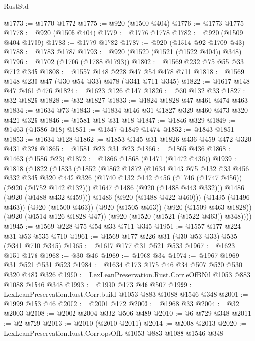\begin{lexlean}{RustStd}
\begin{coremodule}
@1773 := @1770 @1772
@1775 := @920 (@1500 @404)
@1776 := @1773 @1775
@1778 := @920 (@1505 @404)
@1779 := @1776 @1778
@1782 := @920 (@1509 @404 @1709)
@1783 := @1779 @1782
@1787 := @920 (@1514 @92 @1709 @43)
@1788 := @1783 @1787
@1793 := @920 (@1520 (@1521 (@1522 @404)) @348)
@1796 := @1702 (@1706 (@1788 @1793))
@1802 := @1569 @232 @75 @55 @33 @712 @345
@1808 := @1557 @148 @228 @47 @54 @478 @711
@1818 := @1569 @148 @230 @47 (@30 @54 @33) @478 (@341 @711 @345)
@1822 := @1617 @148 @47 @461 @476
@1824 := @1623 @126 @147
@1826 := @30 @132 @33
@1827 := @32 @1826
@1828 := @32 @1827
@1833 := @1824 @1828 @47 @461 @474 @463
@1834 := @1634 @73
@1843 := @1834 @146 @31 @1827 @329 @460 @473 @320 @421 @326
@1846 := @1581 @18 @31 @18
@1847 := @1846 @329
@1849 := @1463 (@1586 @18)
@1851 := @1847 @1849 @1474
@1852 := @1843 @1851
@1853 := @1634 @128
@1862 := @1853 @145 @31 @1826 @436 @459 @472 @320 @431 @326
@1865 := @1581 @23 @31 @23
@1866 := @1865 @436
@1868 := @1463 (@1586 @23)
@1872 := @1866 @1868 (@1471 (@1472 @436))
@1939 := @1818
    (@1822
      (@1833
        (@1852
          (@1862
            @1872
            (@1634
              @143
              @75
              @132
              @33
              @456
              @332
              @345
              @320
              @442
              @326
              (@1740 @132 @142 @456 (@1746 (@1747 @456)) (@920 (@1752 @142 @132)))
              @1647
              @1486
              (@920 (@1488 @443 @332)))
            @1486
            (@920 (@1488 @432 @459)))
          @1486
          (@920 (@1488 @422 @460)))
        (@1495 (@1496 @463))
        (@920 (@1500 @463))
        (@920 (@1505 @463))
        (@920 (@1509 @463 @1828))
        (@920 (@1514 @126 @1828 @47))
        (@920 (@1520 (@1521 (@1522 @463)) @348))))
@1945 := @1569 @228 @75 @54 @33 @711 @345
@1951 := @1557 @177 @224 @31 @53 @535 @710
@1961 := @1569 @177 @226 @31 (@30 @53 @33) @535 (@341 @710 @345)
@1965 := @1617 @177 @31 @521 @533
@1967 := @1623 @151 @176
@1968 := @30 @46
@1969 := @1968 @34
@1974 := @1967 @1969 @31 @521 @531 @523
@1984 := @1634 @173 @175 @46 @34 @507 @520 @530 @320 @483 @326
@1990 := LexLeanPreservation.Rust.Corr.eOfBNil @1053 @883 @1088 @1546 @348
@1993 := @1990 @173 @46 @507
@1999 := LexLeanPreservation.Rust.Corr.build @1053 @883 @1088 @1546 @348
@2001 := @1999 @153 @46
@2002 := @2001 @172
@2003 := @1968 @33
@2004 := @32 @2003
@2008 := @2002 @2004 @332 @506 @489
@2010 := @6 @729 @348
@2011 := @2 @729
@2013 := @2010 (@2010 @2011)
@2014 := @2008 @2013
@2020 := LexLeanPreservation.Rust.Corr.opsOfL @1053 @883 @1088 @1546 @348

\end{coremodule}
\end{lexlean}
